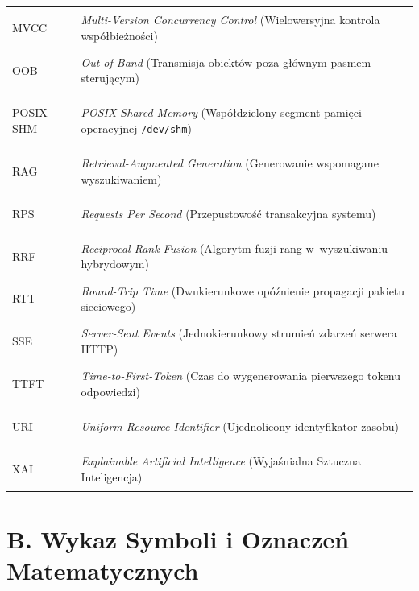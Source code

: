 \begin{longtable}[l]{>{\bfseries\raggedright\arraybackslash}p{2.8cm} >{\raggedright\arraybackslash}p{12.0cm}}
MVCC & \emph{Multi-Version Concurrency Control} (Wielowersyjna kontrola współbieżności) \\[1.5pt]
OOB & \emph{Out-of-Band} (Transmisja obiektów poza głównym pasmem sterującym) \\[1.5pt]
POSIX SHM & \emph{POSIX Shared Memory} (Współdzielony segment pamięci operacyjnej \texttt{/dev/shm}) \\[1.5pt]
RAG & \emph{Retrieval-Augmented Generation} (Generowanie wspomagane wyszukiwaniem) \\[1.5pt]
RPS & \emph{Requests Per Second} (Przepustowość transakcyjna systemu) \\[1.5pt]
RRF & \emph{Reciprocal Rank Fusion} (Algorytm fuzji rang w~wyszukiwaniu hybrydowym) \\[1.5pt]
RTT & \emph{Round-Trip Time} (Dwukierunkowe opóźnienie propagacji pakietu sieciowego) \\[1.5pt]
SSE & \emph{Server-Sent Events} (Jednokierunkowy strumień zdarzeń serwera HTTP) \\[1.5pt]
TTFT & \emph{Time-to-First-Token} (Czas do wygenerowania pierwszego tokenu odpowiedzi) \\[1.5pt]
URI & \emph{Uniform Resource Identifier} (Ujednolicony identyfikator zasobu) \\[1.5pt]
XAI & \emph{Explainable Artificial Intelligence} (Wyjaśnialna Sztuczna Inteligencja) \\
\end{longtable}

\section*{B. Wykaz Symboli i Oznaczeń Matematycznych}

